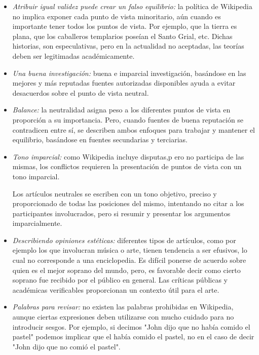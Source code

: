 \begin{itemize}
\begin{itemize}
\item \emph{Atribuir igual validez puede crear un falso equilibrio:} la pol\'itica de Wikipedia no implica exponer cada punto de vista minoritario, a\'un cuando es importante tener todos los puntos de vista. Por ejemplo, que la tierra es plana, que los caballeros templarios pose\'ian el Santo Grial, etc. Dichas historias, son especulativas, pero en la actualidad no aceptadas, las teor\'ias deben ser legitimadas acad\'emicamente.

\item \emph{Una buena investigaci\'on:} buena e imparcial investigaci\'on, bas\'andose en las mejores y m\'as reputadas fuentes autorizadas disponibles ayuda a evitar desacuerdos sobre el punto de vista neutral.

\item \emph{Balance:} la neutralidad asigna peso a los diferentes puntos de vista en proporci\'on a su importancia. Pero, cuando fuentes de buena reputaci\'on se contradicen entre s\'i, se describen ambos enfoques para trabajar y mantener el equilibrio, bas\'andose en fuentes secundarias y terciarias.

\item \emph{Tono imparcial:} como Wikipedia incluye disputas,p ero no participa de las mismas, los conflictos requieren la presentaci\'on de puntos de vista con un tono imparcial.

Los art\'iculos neutrales se escriben con un tono objetivo, preciso y proporcionado de todas las posiciones del mismo, intentando no citar a los participantes involucrados, pero si resumir y presentar los argumentos imparcialmente.

\item \emph{Describiendo opiniones est\'eticas:} diferentes tipos de art\'iculos, como por ejemplo los que involucran m\'usica o arte, tienen tendencia a ser efusivos, lo cual no corresponde a una enciclopedia. Es dif\'icil ponerse de acuerdo sobre quien es el mejor soprano del mundo, pero, es favorable decir como cierto soprano fue recibido por el p\'ublico en general. Las cr\'iticas p\'ublicas y acad\'emicas verificables proporcionan un contexto \'util para el arte.

\item \emph{Palabras para revisar:} no existen las palabras prohibidas en Wikipedia, aunque ciertas expresiones deben utilizarse con mucho cuidado para no introducir sesgos. Por ejemplo, si decimos "John dijo que no hab\'ia comido el pastel"  podemos implicar que el hab\'ia comido el pastel, no en el caso de decir "John dijo que no comi\'o el pastel".


\end{itemize}
\end{itemize}
